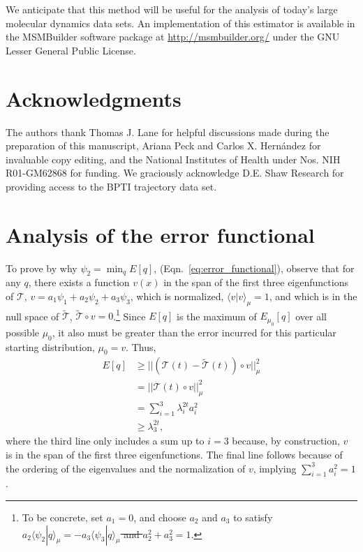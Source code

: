 \documentclass[aip, jcp, reprint, nolinenumbers, twocolumn, nobalancelastpage]{revtex4-1} %
\providecommand{\DIFdeltex}[1]{{\protect\color{red}\sout{#1}}}                      %
\providecommand{\DIFaddbegin}{} %
\providecommand{\DIFaddend}{} %
\providecommand{\DIFdelbegin}{} %
\providecommand{\DIFdelend}{} %
\providecommand{\DIFdel}[1]{\texorpdfstring{\DIFdeltex{#1}}{}} %
\begin{document}
We anticipate that this method will be useful for the analysis of today's large molecular dynamics data sets. An implementation of this estimator is available in the MSMBuilder software package at \url{http://msmbuilder.org/} under the GNU Lesser General Public License.

\section*{Acknowledgments}
The authors thank Thomas J. Lane for helpful discussions made during the preparation of this manuscript, Ariana Peck and Carlos X. Hern\'{a}ndez for invaluable copy editing, and the National Institutes of Health under Nos. NIH R01-GM62868 for funding. We graciously acknowledge D.E. Shaw Research for providing access to the BPTI trajectory data set.

\appendix
\section{Analysis of the error functional}
\label{appendix:error}

To prove by why $\psi_2 = \min_q E[q]$, (Eqn.~\ref{eq:error_functional}), observe that for any $q$, there exists a function $v(x)$ in the span of the first three eigenfunctions of $\mathcal{T}$, $v=a_1 \psi_1+ a_2 \psi_2 + a_3 \psi_3$, which is normalized, $\langle v | v \rangle_\mu = 1$, and which is in the null space of $\tilde{\mathcal{T}}$, $\tilde{\mathcal{T}} \circ v = 0$.\footnote{To be concrete, set $a_1 = 0$, and choose $a_2$ and $a_3$ to satisfy \DIFdelbegin \DIFdel{$a_2 \langle \psi_2 | q \rangle_\mu  = - a_3 \langle \psi_3 | q \rangle_\mu$ and $a_2^2 + a_3^2 = 1$}\DIFdelend \DIFaddbegin {}\DIFaddend .} Since $E[q]$ is the maximum of $E_{\mu_0}[q]$ over all possible $\mu_0$, it also must be greater than the error incurred for this particular starting distribution, $\mu_0=v$. Thus,
\begin{align}
E[q] &\geq || (\mathcal{T}(t) - \tilde{\mathcal{T}}(t)) \circ v ||_\mu^2 \\
&= || \mathcal{T}(t) \circ v ||_\mu^2 \\
&= \sum_{i=1}^3 \lambda_i^{2t} a_i^2 \\
&\geq \lambda_3^{2t},
\end{align}
where the third line only includes a sum up to $i=3$ because, by construction, $v$ is in the span of the first three eigenfunctions. The final line follows because of the ordering of the eigenvalues and the normalization of $v$, implying $\sum_{i=1}^3 a_i^2 = 1$.
\end{document}
